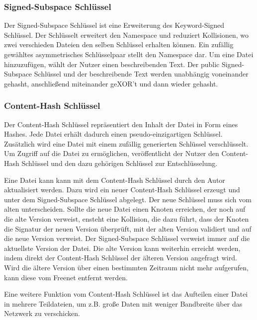 \subsubsection{Signed-Subspace Schlüssel}
Der Signed-Subspace Schlüssel ist eine Erweiterung des Keyword-Signed
Schlüssel. Der Schlüsselt erweitert den Namespace und reduziert Kollisionen, wo
zwei verschieden Dateien den selben Schlüssel erhalten können.  Ein zufällig
gewähltes asymmetrisches Schlüsselpaar stellt den Namespace dar.  Um eine Datei
hinzuzufügen, wählt der Nutzer einen beschreibenden Text. Der public
Signed-Subspace Schlüssel und der beschreibende Text werden unabhängig
voneinander gehasht, anschließend miteinander geXOR't und dann wieder gehasht.

\subsubsection{Content-Hash Schlüssel}
Der Content-Hash Schlüssel repräsentiert den Inhalt der Datei in Form eines
Hashes. Jede Datei erhält dadurch einen pseudo-einzigartigen Schlüssel.
Zusätzlich wird eine Datei mit einem zufällig generierten Schlüssel
verschlüsselt.  Um Zugriff auf die Datei zu ermöglichen, veröffentlicht der
Nutzer den Content-Hash Schlüssel und den dazu gehörigen Schlüssel zur
Entschlüsselung.

Eine Datei kann kann mit dem Content-Hash Schlüssel durch den Autor
aktualisiert werden. Dazu wird ein neuer Content-Hash Schlüssel erzeugt und
unter dem Signed-Subspace Schlüssel abgelegt. Der neue Schlüssel muss sich vom
alten unterscheiden. Sollte die neue Datei einen Knoten erreichen, der noch auf
die alte Version verweist, ensteht eine Kollision, die dazu führt, dass der
Knoten die Signatur der neuen Version überprüft, mit der alten Version
validiert und auf die neue Version verweist. Der Signed-Subspace Schlüssel
verweist immer auf die aktuellste Version der Datei. Die alte Version kann
weiterhin erreicht werden, indem direkt der Content-Hash Schlüssel der älteren
Version angefragt wird. Wird die ältere Version über einen bestimmten Zeitraum
nicht mehr aufgerufen, kann diese vom Freenet entfernt werden.

Eine weitere Funktion vom Content-Hash Schlüssel ist das Aufteilen einer Datei
in mehrere Teildateien, um z.B. große Daten mit weniger Bandbreite über das
Netzwerk zu verschicken.
